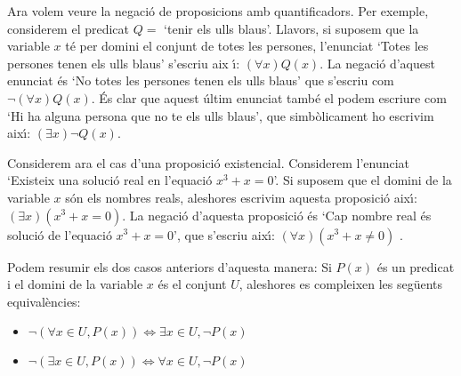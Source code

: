 \bigskip

Ara volem veure la negaci\'{o} de proposicions amb quantificadors. Per
exemple, considerem el predicat $Q=$ `tenir els ulls blaus'. Llavors, si
suposem que la variable $x$ t\'{e} per domini el conjunt de totes les
persones, l'enunciat `Totes les persones tenen els ulls blaus' s'escriu aix%
\'{\i}: $\left( \forall x\right) Q(x)$. La negaci\'{o} d'aquest enunciat
\'{e}s `No totes les persones tenen els ulls blaus' que s'escriu com $%
\lnot\left( \forall x\right) Q(x)$. \'{E}s clar que aquest \'{u}ltim
enunciat tamb\'{e} el podem escriure com `Hi ha alguna persona que no te els
ulls blaus', que simb\`{o}licament ho escrivim aix\'{\i}: $\left( \exists
x\right) \lnot Q\left( x\right) $.

Considerem ara el cas d'una proposici\'{o} existencial. Considerem
l'enunciat `Existeix una soluci\'{o} real en l'equaci\'{o} $x^{3}+x=0$'. Si
suposem que el domini de la variable $x$ s\'{o}n els nombres reals,
aleshores escrivim aquesta proposici\'{o} aix\'{\i}: $\left( \exists
x\right) \left( x^{3}+x=0\right) $. La negaci\'{o} d'aquesta proposici\'{o}
\'{e}s `Cap nombre real \'{e}s soluci\'{o} de l'equaci\'{o} $x^{3}+x=0$',
que s'escriu aix\'{\i}: $\left( \forall x\right) \left( x^{3}+x\neq0\right) $%
.

\bigskip

Podem resumir els dos casos anteriors d'aquesta manera: Si $P(x)$ \'{e}s un
predicat i el domini de la variable $x$ \'{e}s el conjunt $U$, aleshores es
compleixen les seg\"{u}ents equival\`{e}ncies:

\begin{itemize}
\item $\lnot\left( \forall x\in U,P(x)\right) \Longleftrightarrow\exists
x\in U,\lnot P\left( x\right) $

\item $\lnot\left( \exists x\in U,P\left( x\right) \right)
\Longleftrightarrow\forall x\in U,\lnot P\left( x\right) $
\end{itemize}

\bigskip

